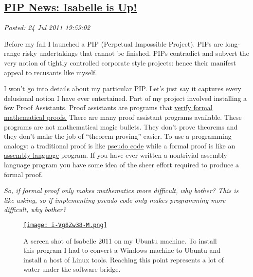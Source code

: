 %

\subsection*{\href{https://bakerjd99.wordpress.com/2011/07/24/pip-news-isabelle-is-up/}{PIP News: Isabelle is Up!}}


\noindent\emph{Posted: 24 Jul 2011 19:59:02}
\vspace{6pt}

Before my fall I launched a PIP (Perpetual Impossible Project). PIPs are
long-range risky undertakings that cannot be finished. PIPs
contradict and subvert the very notion of tightly controlled corporate
style projects: hence their manifest appeal to recusants like myself.

I won't go into details about my particular PIP. Let's just say it
captures every delusional notion I have ever entertained. Part of my
project involved installing a few Proof Assistants. Proof assistants are
programs that \href{http://www.cs.ru.nl/~freek/100/}{verify formal
mathematical proofs.} There are many proof assistant programs available.
These programs are not mathematical magic bullets. They don't prove
theorems and they don't make the job of ``theorem proving'' easier. To
use a programming analogy: a traditional proof is like
\href{http://en.wikipedia.org/wiki/Pseudocode}{pseudo code} while a
formal proof is like an
\href{http://en.wikipedia.org/wiki/Assembly\_language}{assembly
language} program. If you have ever written a nontrivial assembly
language program you have some idea of the sheer effort required to
produce a formal proof.

\emph{So, if formal proof only makes mathematics more difficult, why
bother? This is like asking, so if implementing pseudo code only makes
programming more difficult, why bother?}


\captionsetup[figure]{labelformat=empty}
\begin{figure}[htbp]
\centering
\href{http://www.cl.cam.ac.uk/research/hvg/Isabelle/index.html}{\texttt{[image: i-Vg8Zw38-M.png]}}
\caption{A  screen shot of Isabelle 2011 on my Ubuntu machine. To install this  
program I had to convert a Windows machine to Ubuntu and install a host  of Linux tools. 
Reaching this point represents a lot of water under the  software  bridge.}
\label{fig:1658X0}
\end{figure}





%